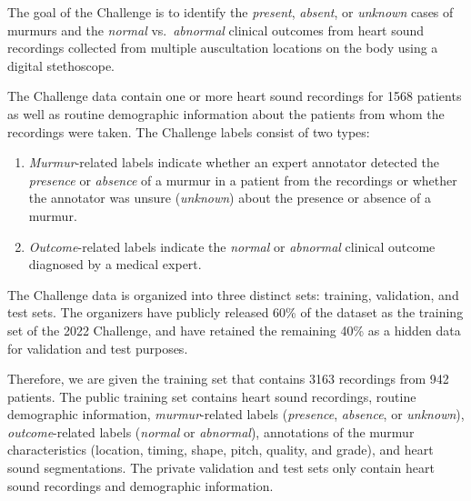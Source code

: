 \documentclass[twocolumn]{cinc}
\begin{document}
The goal of the Challenge is to identify the \textit{present}, \textit{absent}, or \textit{unknown} cases of murmurs and the \textit{normal} vs.\ \textit{abnormal} clinical outcomes from heart sound recordings collected from multiple auscultation locations on the body using a digital stethoscope.


The Challenge data contain one or more heart sound recordings for 1568 patients as well as routine demographic information about the patients from whom the recordings were taken. The Challenge labels consist of two types:

\begin{enumerate}
\item \textit{Murmur}-related labels indicate whether an expert annotator detected the \textit{presence} or \textit{absence} of a murmur in a patient from the recordings or whether the annotator was unsure (\textit{unknown}) about the presence or absence of a murmur.
\item \textit{Outcome}-related labels indicate the \textit{normal} or \textit{abnormal} clinical outcome diagnosed by a medical expert.
\end{enumerate}

The Challenge data is organized into three distinct sets: training, validation, and test sets. The organizers have publicly released 60\% of the dataset as the training set of the 2022 Challenge, and have retained the remaining 40\% as a hidden data for validation and test purposes. 

Therefore, we are given the training set that contains 3163 recordings from 942 patients. The public training set contains heart sound recordings, routine demographic information, \textit{murmur}-related labels (\textit{presence}, \textit{absence}, or \textit{unknown}), \textit{outcome}-related labels (\textit{normal} or \textit{abnormal}), annotations of the murmur characteristics (location, timing, shape, pitch, quality, and grade), and heart sound segmentations. The private validation and test sets only contain heart sound recordings and demographic information.


%
%
%
\end{document}
